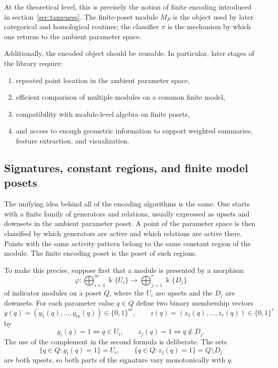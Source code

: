 \documentclass[11pt]{article}
\newcommand{\kk}{\Bbbk}
\theoremstyle{definition}
\theoremstyle{remark}
\begin{document}
At the theoretical level, this is precisely the notion of finite encoding introduced in section~\ref{sec:tameness}. The finite-poset module $M_P$ is the object used by later categorical and homological routines; the classifier $\pi$ is the mechanism by which one returns to the ambient parameter space.

Additionally, the encoded object should be reusable. In particular, later stages of the library require:
\begin{enumerate}[label=(\alph*)]
	\item repeated point location in the ambient parameter space,
	\item efficient comparison of multiple modules on a common finite model,
	\item compatibility with module-level algebra on finite posets,
	\item and access to enough geometric information to support weighted summaries, feature extraction, and visualization.
\end{enumerate}

\subsection{Signatures, constant regions, and finite model posets}
\label{subsec:encoding-signatures}

The unifying idea behind all of the encoding algorithms is the same.  One starts with a finite family of generators and relations, usually expressed as upsets and downsets in the ambient parameter poset.  A point of the parameter space is then classified by which generators are active and which relations are active there.  Points with the same activity pattern belong to the same constant region of the module.  The finite encoding poset is the poset of such regions.

To make this precise, suppose first that a module is presented by a morphism
\[
\varphi\colon \bigoplus_{i=1}^m \kk\{U_i\}\longrightarrow \bigoplus_{j=1}^r \kk\{D_j\}
\]
of indicator modules on a poset $Q$, where the $U_i$ are upsets and the $D_j$ are downsets.  For each parameter value $q\in Q$ define two binary membership vectors
\[
y(q)=(y_1(q),\dots,y_m(q))\in\{0,1\}^m,
\qquad
z(q)=(z_1(q),\dots,z_r(q))\in\{0,1\}^r
\]
by
\[
y_i(q)=1 \Longleftrightarrow q\in U_i,
\qquad
z_j(q)=1 \Longleftrightarrow q\notin D_j.
\]
The use of the complement in the second formula is deliberate.  The sets
\[
\{q\in Q:y_i(q)=1\}=U_i,
\qquad
\{q\in Q:z_j(q)=1\}=Q\setminus D_j
\]
are both upsets, so both parts of the signature vary monotonically with $q$.
\end{document}
